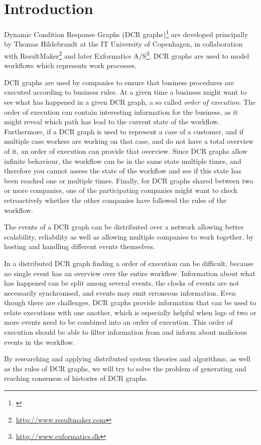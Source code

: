 \chapter{Introduction}
	Dynamic Condition Response Graphs (DCR graphs)\footnote{\cite{hildebrandt2011declarative}} are developed principally by Thomas Hildebrandt at the IT University of Copenhagen, in collaboration with ResultMaker\footnote{\url{http://www.resultmaker.com}} and later Exformatics A/S\footnote{\url{http://www.exformatics.dk}}. DCR graphs are used to model workflows which represents work processes.
	
	\newpar DCR graphs are used by companies to ensure that business procedures are executed according to business rules. At a given time a business might want to see what has happened in a given DCR graph, a so called \textit{order of execution}. The order of execution can contain interesting information for the business, as it might reveal which path has lead to the current state of the workflow. Furthermore, if a DCR graph is used to represent a case of a customer, and if multiple case workers are working on that case, and do not have a total overview of it, an order of execution can provide that overview. Since DCR graphs allow infinite behaviour, the workflow can be in the same state multiple times, and therefore you cannot assess the state of the workflow and see if this state has been reached one or multiple times. Finally, for DCR graphs shared between two or more companies, one of the participating companies might want to check retroactively whether the other companies have followed the rules of the workflow.
	
	\newpar The events of a DCR graph can be distributed over a network allowing better scalability, reliability as well as allowing multiple companies to work together, by hosting and handling different events themselves.
	
	\newpar In a distributed DCR graph finding a order of execution can be difficult, because no single event has an overview over the entire workflow. Information about what has happened can be split among several events, the clocks of events are not necessarily synchronised, and events may emit erroneous information. Even though there are challenges, DCR graphs provide information that can be used to relate executions with one another, which is especially helpful when logs of two or more events need to be combined into an order of execution. This order of execution should be able to filter information from and inform about malicious events in the workflow.

	
	\newpar By researching and applying distributed system theories and algorithms, as well as the rules of DCR graphs, we will try to solve the problem of generating and reaching consensus of histories of DCR graphs. 